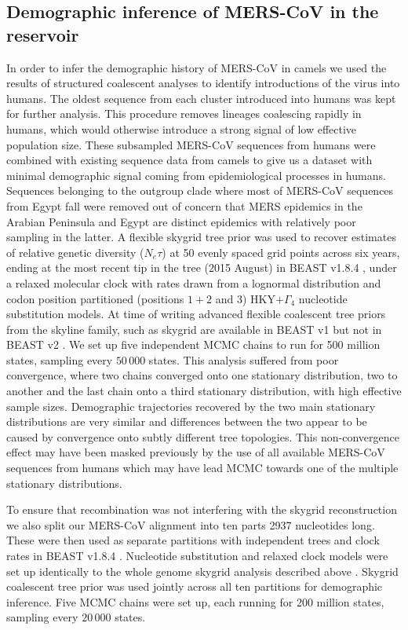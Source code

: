 \documentclass[11pt,oneside,letterpaper]{article}
\begin{document}
\subsection*{Demographic inference of MERS-CoV in the reservoir}
In order to infer the demographic history of MERS-CoV in camels we used the results of structured coalescent analyses to identify introductions of the virus into humans.
The oldest sequence from each cluster introduced into humans was kept for further analysis.
This procedure removes lineages coalescing rapidly in humans, which would otherwise introduce a strong signal of low effective population size.
These subsampled MERS-CoV sequences from humans were combined with existing sequence data from camels to give us a dataset with minimal demographic signal coming from epidemiological processes in humans.
Sequences belonging to the outgroup clade where most of MERS-CoV sequences from Egypt fall were removed out of concern that MERS epidemics in the Arabian Peninsula and Egypt are distinct epidemics with relatively poor sampling in the latter.
A flexible skygrid tree prior \citep{gill_2013} was used to recover estimates of relative genetic diversity ($N_{e}\tau$) at 50 evenly spaced grid points across six years, ending at the most recent tip in the tree (2015 August) in BEAST v1.8.4 \citep{drummond_bayesian_2012}, under a relaxed molecular clock with rates drawn from a lognormal distribution \citep{drummond_2006} and codon position partitioned (positions $1+2$ and $3$) HKY$+\Gamma_{4}$ \citep{hky_1985,yang_1994} nucleotide substitution models.
At time of writing advanced flexible coalescent tree priors from the skyline family, such as skygrid \citep{gill_2013} are available in BEAST v1 \citep{drummond_bayesian_2012} but not in BEAST v2 \citep{bouckaert_beast_2014}.
We set up five independent MCMC chains to run for 500 million states, sampling every $50\,000$ states.
This analysis suffered from poor convergence, where two chains converged onto one stationary distribution, two to another and the last chain onto a third stationary distribution, with high effective sample sizes.
Demographic trajectories recovered by the two main stationary distributions are very similar and differences between the two appear to be caused by convergence onto subtly different tree topologies.
This non-convergence effect may have been masked previously by the use of all available MERS-CoV sequences from humans which may have lead MCMC towards one of the multiple stationary distributions.

To ensure that recombination was not interfering with the skygrid reconstruction we also split our MERS-CoV alignment into ten parts 2937 nucleotides long.
These were then used as separate partitions with independent trees and clock rates in BEAST v1.8.4 \citep{drummond_bayesian_2012}.
Nucleotide substitution and relaxed clock models were set up identically to the whole genome skygrid analysis described above \citep{drummond_2006,hky_1985,yang_1994}.
Skygrid coalescent tree prior \citep{gill_2013} was used jointly across all ten partitions for demographic inference.
Five MCMC chains were set up, each running for 200 million states, sampling every $20\,000$ states.
\end{document}
